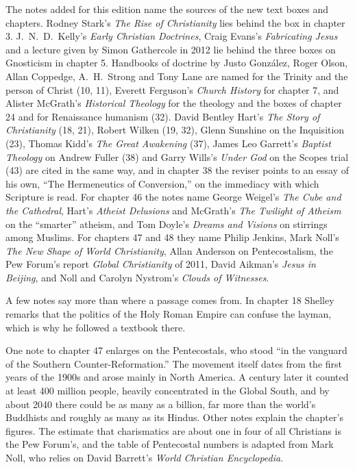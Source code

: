 The notes added for this edition name the sources of the new text boxes and chapters. Rodney Stark's
\emph{The Rise of Christianity} lies behind the box in chapter 3. J.~N.~D.~Kelly's \emph{Early
Christian Doctrines}, Craig Evans's \emph{Fabricating Jesus} and a lecture given by Simon Gathercole
in 2012 lie behind the three boxes on Gnosticism in chapter 5. Handbooks of doctrine by Justo
Gonz\'alez, Roger Olson, Allan Coppedge, A.~H.~Strong and Tony Lane are named for the Trinity and
the person of Christ (10, 11), Everett Ferguson's \emph{Church History} for chapter 7, and Alister
McGrath's \emph{Historical Theology} for the theology and the boxes of chapter 24 and for
Renaissance humanism (32). David Bentley Hart's \emph{The Story of Christianity} (18, 21), Robert
Wilken (19, 32), Glenn Sunshine on the Inquisition (23), Thomas Kidd's \emph{The Great Awakening}
(37), James Leo Garrett's \emph{Baptist Theology} on Andrew Fuller (38) and Garry Wills's \emph{Under
God} on the Scopes trial (43) are cited in the same way, and in chapter 38 the reviser points to an
essay of his own, ``The Hermeneutics of Conversion,'' on the immediacy with which Scripture is read. For chapter 46 the notes name
George Weigel's \emph{The Cube and the Cathedral}, Hart's \emph{Atheist Delusions} and McGrath's
\emph{The Twilight of Atheism} on the ``smarter'' atheism, and Tom Doyle's \emph{Dreams and Visions}
on stirrings among Muslims. For chapters 47 and 48 they name Philip Jenkins, Mark Noll's \emph{The
New Shape of World Christianity}, Allan Anderson on Pentecostalism, the Pew Forum's report
\emph{Global Christianity} of 2011, David Aikman's \emph{Jesus in Beijing}, and Noll and Carolyn
Nystrom's \emph{Clouds of Witnesses}.

A few notes say more than where a passage comes from. In chapter 18 Shelley remarks that the politics
of the Holy Roman Empire can confuse the layman, which is why he followed a textbook there.

One note to chapter 47 enlarges on the Pentecostals, who stood ``in the vanguard of the Southern
Counter-Reformation.'' The movement itself dates from the first years of the 1900s and arose mainly in North America. A century later it counted at least 400 million people, heavily concentrated in the
Global South, and by about 2040 there could be as many as a billion, far more than the world's
Buddhists and roughly as many as its Hindus. Other notes explain the chapter's figures. The estimate
that charismatics are about one in four of all Christians is the Pew Forum's, and the table of
Pentecostal numbers is adapted from Mark Noll, who relies on David Barrett's \emph{World Christian
Encyclopedia}.

